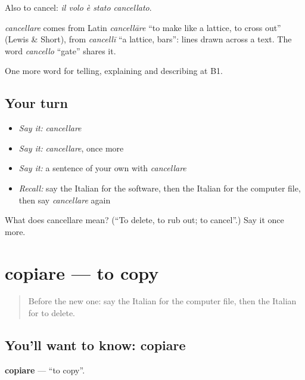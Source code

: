Also to cancel: \emph{il volo è stato cancellato}.

\begin{cousinweb}
\emph{cancellare} comes from Latin \emph{cancellāre} \textquotedblleft{}to make like a lattice, to cross out\textquotedblright{} (Lewis \& Short), from \emph{cancellī} \textquotedblleft{}a lattice, bars\textquotedblright{}: lines drawn across a text. The word \emph{cancello} \textquotedblleft{}gate\textquotedblright{} shares it.
\end{cousinweb}

\begin{grammarlens}[title={What you've built}]
One more word for telling, explaining and describing at B1.
\end{grammarlens}

\subsection*{Your turn}
\begin{itemize}
\raggedright
  \item \emph{Say it:} \emph{cancellare}
  \item \emph{Say it:} \emph{cancellare}, once more
  \item \emph{Say it:} a sentence of your own with \emph{cancellare}
  \item \emph{Recall:} say the Italian for the software, then the Italian for the computer file, then say \emph{cancellare} again
\end{itemize}

\begin{tcolorbox}[breakable,colback=teal!4,colframe=teal!35!black,title={Before you move on}]
What does cancellare mean? (\textquotedblleft{}To delete, to rub out; to cancel\textquotedblright{}.) Say it once more.
\end{tcolorbox}
\section[copiare]{copiare — to copy}

\label{lesson:IT-C401-copiare}



\begin{quote}
Before the new one: say the Italian for the computer file, then the Italian for to delete.
\end{quote}

\subsection*{You'll want to know: copiare}
\textbf{copiare} — \textquotedblleft{}to copy\textquotedblright{}.

